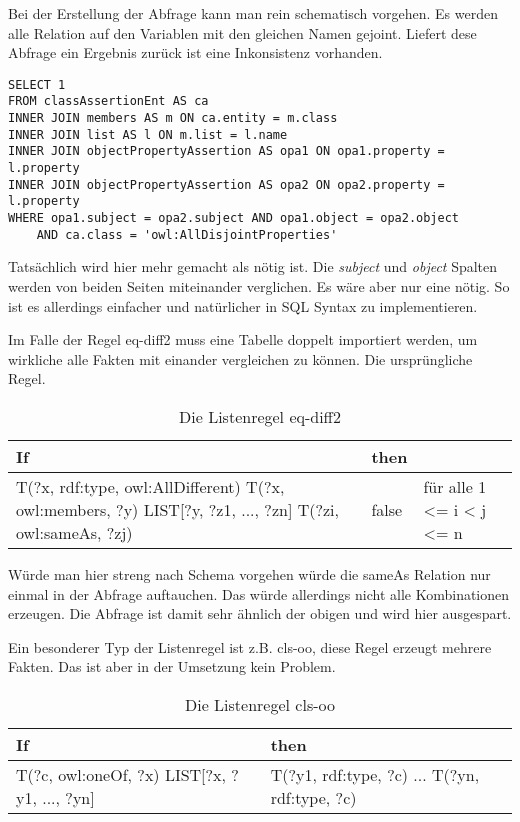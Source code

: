 Bei der Erstellung der Abfrage kann man rein schematisch vorgehen. Es werden alle Relation auf den Variablen mit den gleichen Namen gejoint. Liefert dese Abfrage ein Ergebnis zurück ist eine Inkonsistenz vorhanden.

\begin{lstlisting}
SELECT 1
FROM classAssertionEnt AS ca
INNER JOIN members AS m ON ca.entity = m.class
INNER JOIN list AS l ON m.list = l.name
INNER JOIN objectPropertyAssertion AS opa1 ON opa1.property = l.property
INNER JOIN objectPropertyAssertion AS opa2 ON opa2.property = l.property
WHERE opa1.subject = opa2.subject AND opa1.object = opa2.object
	AND ca.class = 'owl:AllDisjointProperties'
\end{lstlisting}

Tatsächlich wird hier mehr gemacht als nötig ist. Die \emph{subject} und \emph{object} Spalten werden von beiden Seiten miteinander verglichen. Es wäre aber nur eine nötig. So ist es allerdings einfacher und natürlicher in SQL Syntax zu implementieren.

Im Falle der Regel eq-diff2 muss eine Tabelle doppelt importiert werden, um wirkliche alle Fakten mit einander vergleichen zu können. Die ursprüngliche Regel.
\begin{table}
\begin{tabular}{l|l|l}
If & then & \\ \hline
T(?x, rdf:type, owl:AllDifferent)
T(?x, owl:members, ?y)
LIST[?y, ?z1, ..., ?zn]
T(?zi, owl:sameAs, ?zj) & false & für alle 1 <= i < j <= n
\end{tabular}
\caption{Die Listenregel eq-diff2}
\label{rule-eq-diff2}
\end{table}


Würde man hier streng nach Schema vorgehen würde die sameAs Relation nur einmal in der Abfrage auftauchen. Das würde allerdings nicht alle Kombinationen erzeugen. Die Abfrage ist damit sehr ähnlich der obigen und wird hier ausgespart.

Ein besonderer Typ der Listenregel ist z.B. cls-oo, diese Regel erzeugt mehrere Fakten. Das ist aber in der Umsetzung kein Problem.
\begin{table}
\begin{tabular}{l|l}
If & then \\ \hline
T(?c, owl:oneOf, ?x)
LIST[?x, ?y1, ..., ?yn] & T(?y1, rdf:type, ?c)
								...
								T(?yn, rdf:type, ?c) 
\end{tabular}
\caption{Die Listenregel cls-oo}
\label{rule-cls-oo}
\end{table}


